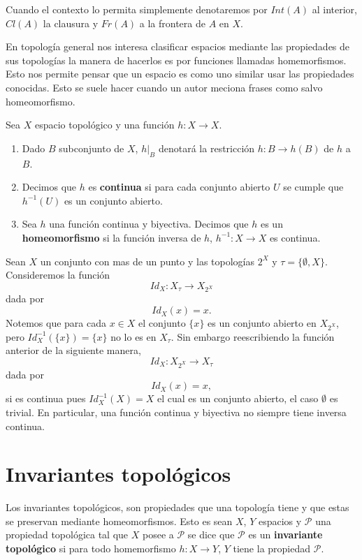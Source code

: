 \begin{cn}
Cuando el contexto lo permita simplemente denotaremos por $Int(A)$ al interior, $Cl(A)$ la clausura y  $Fr(A)$ a la frontera de $A$ en $X$.
\end{cn}


En topología general nos interesa clasificar espacios mediante las propiedades de sus topologías la manera de hacerlos es por funciones llamadas homemorfismos. Esto nos permite pensar que un espacio es como uno similar usar las propiedades conocidas. Esto se suele hacer cuando un autor meciona frases como salvo homeomorfismo.

\begin{df}
Sea $X$ espacio topológico y una función $h:X \to X$. 
\begin{enumerate}

	\item Dado $B$ subconjunto de $X$, $h|_B$ denotará la restricción $h:B \to h(B)$ de $h$ a $B$. 
	
	\item  Decimos que $h$ es \textbf{continua} si para cada conjunto abierto $U$ se cumple que $h^{-1}(U)$ es un conjunto abierto.
	
	\item  Sea $h$ una función continua y biyectiva. Decimos que $h$ es un \textbf{homeomorfismo} si la función inversa de $h$, $h^{-1}:X \to X$ es continua. 	
\end{enumerate}
\end{df}


\begin{ej}
Sean $X$ un conjunto con mas de un punto y las topologías $2^X$ y $\tau=\{\emptyset, X\}$. Consideremos la función $$Id_X:X_{\tau} \to X_{2^X}$$ dada por $$Id_X(x)=x.$$
Notemos que para cada $x \in X$ el conjunto $\{x\}$ es un conjunto abierto en $X_{2^X}$, pero $Id_X^{-1}(\{x\})= \{x\}$ no lo es en $X_\tau$. Sin embargo reescribiendo  la función anterior de la siguiente manera,  $$Id_X:X_{2^X} \to X_{\tau}$$ dada por $$Id_X(x)=x,$$
si es continua pues $Id_X^{-1}(X)=X$ el cual es un conjunto abierto, el caso $\emptyset$ es trivial. En particular, una función continua y biyectiva no siempre tiene inversa continua. 
\end{ej}

\section*{Invariantes topológicos}

Los invariantes topológicos, son propiedades que una topología tiene y que estas se preservan mediante homeomorfismos. Esto es sean $X$, $Y$ espacios y $\mathcal{P}$ una propiedad topológica tal que $X$ posee a $\mathcal{P}$ se dice que $\mathcal{P}$ es un \textbf{invariante topológico} si para todo homemorfismo $h:X \to Y$,  $Y$ tiene la propiedad $\mathcal{P}$.



